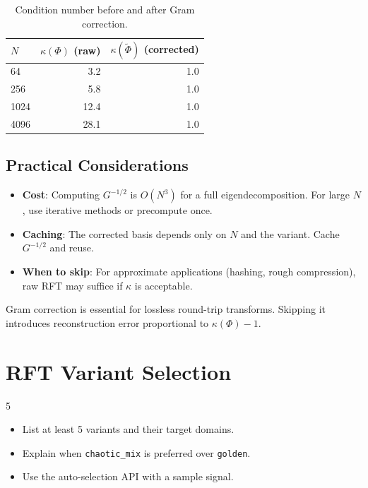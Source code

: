 \documentclass[11pt, a4paper, openany]{book}
\theoremstyle{definition}
\begin{document}
\begin{table}[h]
\centering
\begin{tabular}{@{}lrr@{}}\toprule
$N$ & $\kappa(\Phi)$ (raw) & $\kappa(\tilde{\Phi})$ (corrected) \\ \midrule
64 & 3.2 & 1.0 \\
256 & 5.8 & 1.0 \\
1024 & 12.4 & 1.0 \\
4096 & 28.1 & 1.0 \\ \bottomrule
\end{tabular}
\caption{Condition number before and after Gram correction.}
\end{table}

\section{Practical Considerations}
\begin{itemize}
    \item \textbf{Cost}: Computing $G^{-1/2}$ is $O(N^3)$ for a full eigendecomposition. For large $N$, use iterative methods or precompute once.
    \item \textbf{Caching}: The corrected basis depends only on $N$ and the variant. Cache $G^{-1/2}$ and reuse.
    \item \textbf{When to skip}: For approximate applications (hashing, rough compression), raw RFT may suffice if $\kappa$ is acceptable.
\end{itemize}

\begin{warningbox}
Gram correction is essential for lossless round-trip transforms. Skipping it introduces reconstruction error proportional to $\kappa(\Phi) - 1$.
\end{warningbox}

\chapter{RFT Variant Selection}

\begin{todobox}{5}
\begin{itemize}
    \item[$\square$] List at least 5 variants and their target domains.
    \item[$\square$] Explain when \texttt{chaotic\_mix} is preferred over \texttt{golden}.
    \item[$\square$] Use the auto-selection API with a sample signal.
\end{itemize}
\end{todobox}
\end{document}
